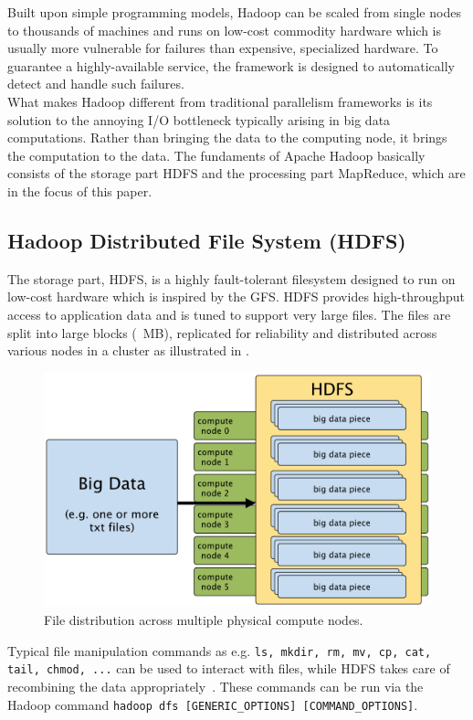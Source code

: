 Built upon simple programming models, Hadoop can be scaled from single nodes to thousands of machines and runs on low-cost commodity hardware which is usually more vulnerable for failures than expensive, specialized hardware. To guarantee a highly-available service, the framework is designed to automatically detect and handle such failures.\\

What makes Hadoop different from traditional parallelism frameworks is its solution to the annoying I/O bottleneck typically arising in big data computations. Rather than bringing the data to the computing node, it brings the computation to the data. The fundaments of Apache Hadoop basically consists of the storage part \ac{HDFS} and the processing part MapReduce, which are in the focus of this paper.

\subsection{Hadoop Distributed File System (HDFS)}
The storage part, \ac{HDFS}, is a highly fault-tolerant filesystem designed to run on low-cost hardware which is inspired by the \ac{GFS}\cite{GFS}. \ac{HDFS} provides high-throughput access to application data and is tuned to support very large files. The files are split into large blocks (~MB), replicated for reliability and distributed across various nodes in a cluster as illustrated in .

\begin{figure}[ht]
\centering
\includegraphics[width=0.50\linewidth]{content/drawings/BigDataDistribution}
\caption{File distribution across multiple physical compute nodes.}
\footnotesize 
\label{fig:HDFS}
\end{figure}
Typical file manipulation commands as e.g. \texttt{ls, mkdir, rm, mv, cp, cat, tail, chmod, ...} can be used to interact with files, while \ac{HDFS} takes care of recombining the data appropriately~\cite{lockwood}. These commands can be run via the Hadoop command  \texttt{hadoop dfs [GENERIC\_OPTIONS] [COMMAND\_OPTIONS]}.

